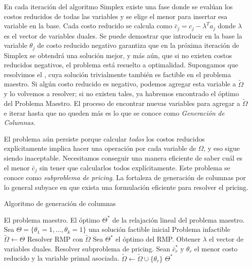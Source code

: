 En cada iteración del algoritmo Simplex existe una fase donde se evalúan los costos reducidos de todas las variables y se elige el menor para insertar esa variable en la base. Cada costo reducido se calcula como $\bar{c}_j = c_j - \lambda^{T}a_j$ donde $\lambda$ es el vector de variables duales. Se puede demostrar que introducir en la base la variable $\theta_j$ de costo reducido negativo garantiza que en la próxima iteración de Simplex se obtendrá una solución mejor, y más aún, que si no existen costos reducidos negativos, el problema está resuelto a optimalidad. Supongamos que resolvimos el , cuya solución trivialmente también es factible en el problema maestro. Si algún costo reducido es negativo, podemos agregar esta variable a $\tilde{\Omega}$ y lo volvemos a resolver; si no existen tales, ya habremos encontrado el óptimo del Problema Maestro. El proceso de encontrar nuevas variables para agregar a $\tilde{\Omega}$ e iterar hasta que no queden más es lo que se conoce como \emph{Generación de Columnas}.

El problema aún persiste porque calcular \emph{todos} los costos reducidos explícitamente implica hacer una operación por cada variable de $\Omega$, y eso sigue siendo inaceptable. Necesitamos conseguir una manera eficiente de saber cuál es el menor $\bar{c}_j$ sin tener que calcularlos todos explícitamente. Este problema se conoce como \emph{subproblema de pricing}. La fortaleza de generación de columnas por lo general subyace en que exista una formulación eficiente para resolver el pricing.

\begin{algorithm}[H]
    \caption{Algoritmo de generación de columnas}
    \label{al:column-generation}
    \begin{algorithmic}[1]
        \Require El problema maestro. 
        \Ensure El óptimo $\Theta^{*}$ de la relajación lineal del problema maestro. 
        \State Sea $\Theta = \{\theta_1 = 1, \dots, \theta_k = 1\}$ una solución factible inicial
        \If{$\Theta = \emptyset$}
            \Return Problema infactible
        \EndIf
        \State $\tilde{\Omega} \gets \Theta$
            \State Resolver RMP con $\tilde{\Omega}$
            \State Sea $\Theta^{*}$ el óptimo del RMP.
            \State Obtener $\lambda$ el vector de variables duales.
            \State Resolver subproblema de pricing.
            \State Sean $\bar{c}^{*}_r$ y $\theta_r$ el menor costo reducido y la variable primal asociada. 
            	\Break
            \EndIf
            \State $\tilde{\Omega} \gets \tilde{\Omega} \cup \{\theta_r\}$
        \EndWhile
        \Return $\Theta^{*}$
    \end{algorithmic}
\end{algorithm}

